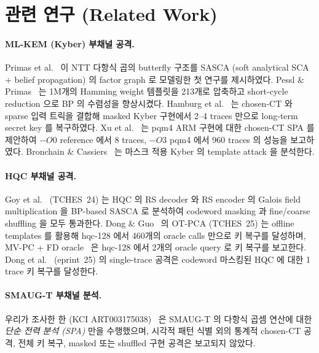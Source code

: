 \documentclass[11pt]{article}
\theoremstyle{plain}
\theoremstyle{definition}
\theoremstyle{remark}
\begin{document}
\section{관련 연구 (Related Work)}
\label{sec:related}

\paragraph{ML-KEM (Kyber) 부채널 공격.}
Primas et al.~\citep{primas17} 이 NTT 다항식 곱의 butterfly 구조를 SASCA
(soft analytical SCA + belief propagation) 의 factor graph 로 모델링한 첫
연구를 제시하였다. Pessl \& Primas~\citep{pessl19} 는 1M개의 Hamming weight
템플릿을 213개로 압축하고 short-cycle reduction 으로 BP 의 수렴성을 향상시켰다.
Hamburg et al.~\citep{hamburg21} 는 chosen-CT 와 sparse 입력 트릭을 결합해
masked Kyber 구현에서 2--4 traces 만으로 long-term secret key 를 복구하였다.
Xu et al.~\citep{xu21} 는 pqm4 ARM 구현에 대한 chosen-CT SPA 를 제안하여
$-O0$ reference 에서 8 traces, $-O3$ pqm4 에서 960 traces 의 성능을 보고하였다.
Bronchain \& Cassiers~\citep{bronchain20masked} 는 마스크 적용 Kyber 의
template attack 을 분석한다.

\paragraph{HQC 부채널 공격.}
Goy et al.~\citep{goy24} (TCHES~24) 는 HQC 의 RS decoder 와 RS encoder 의
Galois field multiplication 을 BP-based SASCA 로 분석하여 codeword masking
과 fine/coarse shuffling 을 모두 통과한다. Dong \& Guo~\citep{donggu025otpca}
의 OT-PCA (TCHES~25) 는 offline templates 를 활용해 hqc-128 에서 460개의
oracle calls 만으로 키 복구를 달성하며, MV-PC + FD oracle~\citep{donggu025mvfd}
은 hqc-128 에서 2개의 oracle query 로 키 복구를 보고한다.
Dong et al.~\citep{donggu025singletrace} (eprint~25) 의 single-trace 공격은
codeword 마스킹된 HQC 에 대한 1 trace 키 복구를 달성한다.

\paragraph{SMAUG-T 부채널 분석.}
우리가 조사한 한 (KCI ART003175038)~\citep{smaugt-spa-kci} 은 SMAUG-T 의
다항식 곱셈 연산에 대한 \emph{단순 전력 분석 (SPA)} 만을 수행했으며,
시각적 패턴 식별 외의 통계적 chosen-CT 공격, 전체 키 복구, masked
또는 shuffled 구현 공격은 보고되지 않았다.
\end{document}
